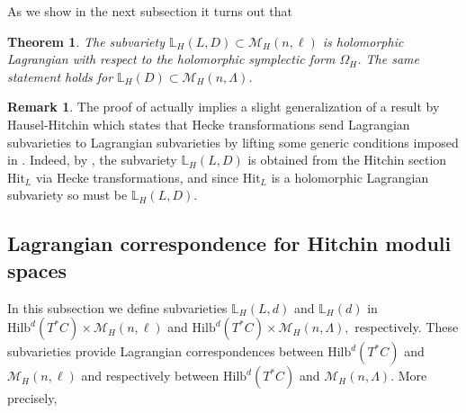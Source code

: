 \documentclass[twoside, 11pt]{article}
\numberwithin{equation}{section}
\theoremstyle{theorem}
\newtheorem{theorem}{Theorem}
\numberwithin{theorem}{section}
\theoremstyle{definition}
\newtheorem{remark}[remark]{Remark}
\begin{document}
As we show in the next subsection it turns out that 

\begin{theorem}\label{thm: Lag Higgs}
The subvariety $\mathbb{L}_{H}(L,D)\subset \mathcal{M}_{H}(n, \ell)$ is holomorphic Lagrangian with respect to the holomorphic symplectic form $\Omega_H$. The same statement holds for $\mathbb L_H(D)\subset\mathcal M_H(n,\Lambda)$.
\end{theorem}

\begin{remark} 
The proof of  actually implies a slight generalization of a result by Hausel-Hitchin which states that Hecke transformations send Lagrangian subvarieties to Lagrangian subvarieties by lifting some generic conditions imposed in \cite[Theorem~4.21]{HH22}. 
Indeed, by , the subvariety \(\mathbb{L}_{H}(L,D)\) is obtained from the Hitchin section \(\mathrm{Hit}_L\) via Hecke transformations, and since \(\mathrm{Hit}_L\) is a holomorphic Lagrangian subvariety so must be \(\mathbb{L}_{H}(L,D)\).
\end{remark}

\subsection{Lagrangian correspondence for Hitchin moduli spaces}
In this subsection we define subvarieties
\(\mathbb{L}_{H}(L,d)\) and \(\mathbb{L}_{H}(d)\) in
\(
\mathrm{Hilb}^d(T^*C) \times \mathcal{M}_{H}(n, \ell)
\)
and
\(
\mathrm{Hilb}^d(T^*C) \times \mathcal{M}_H(n,\Lambda),
\)  
respectively. These subvarieties provide Lagrangian correspondences between $\mathrm{Hilb}^d(T^*C)$ and $\mathcal{M}_{H}(n, \ell)$ and respectively between $\mathrm{Hilb}^d(T^*C)$ and $\mathcal{M}_H(n,\Lambda)$. More precisely,
\end{document}
